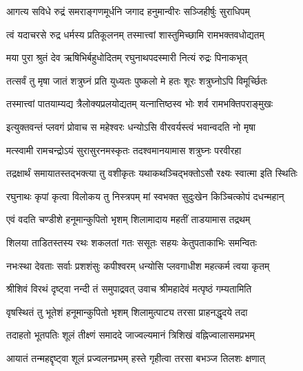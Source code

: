 

\twolineshloka
{आगत्य सविधे रुद्रं समराङ्गणमूर्धनि}
{जगाद हनुमान्वीरः सञ्जिहीर्षुः सुराधिपम्}%


\twolineshloka
{त्वं यदाचरसे रुद्र धर्मस्य प्रतिकूलनम्}
{तस्मात्त्वां शास्तुमिच्छामि रामभक्तवधोद्यतम्}%

\twolineshloka
{मया पुरा श्रुतं देव ऋषिभिर्बहुधोदितम्}
{रघुनाथपदस्मारी नित्यं रुद्रः पिनाकभृत्}%

\twolineshloka
{तत्सर्वं तु मृषा जातं शत्रुघ्नं प्रति युध्यतः}
{पुष्कलो मे हतः शूरः शत्रुघ्नोऽपि विमूर्च्छितः}%

\twolineshloka
{तस्मात्त्वां पातयाम्यद्य त्रैलोक्यप्रलयोद्यतम्}
{यत्नात्तिष्ठस्व भोः शर्व रामभक्तिपराङ्मुखः}%


\twolineshloka
{इत्युक्तवन्तं प्लवगं प्रोवाच स महेश्वरः}
{धन्योऽसि वीरवर्यस्त्वं भवान्वदति नो मृषा}%

\twolineshloka
{मत्स्वामी रामचन्द्रोऽयं सुरासुरनमस्कृतः}
{तदश्वमानयामास शत्रुघ्नः परवीरहा}%

\twolineshloka
{तद्रक्षार्थं समायातस्तद्भक्त्या तु वशीकृतः}
{यथाकथञ्चिद्भक्तोऽसौ रक्ष्यः स्वात्मा इति स्थितिः}%

\twolineshloka
{रघुनाथः कृपां कृत्वा विलोकय तु निस्त्रपम्}
{मां स्वभक्त सुदुःखेन किञ्चित्कोपं दधन्महान्}%


\twolineshloka
{एवं वदति चण्डीशे हनूमान्कुपितो भृशम्}
{शिलामादाय महतीं ताडयामास तद्रथम्}%

\twolineshloka
{शिलया ताडितस्तस्य रथः शकलतां गतः}
{ससूतः सहयः केतुपताकाभिः समन्वितः}%

\twolineshloka
{नभःस्था देवताः सर्वाः प्रशशंसुः कपीश्वरम्}
{धन्योसि प्लवगाधीश महत्कर्म त्वया कृतम्}%

\twolineshloka
{श्रीशिवं विरथं दृष्ट्वा नन्दी तं समुपाद्रवत्}
{उवाच श्रीमहादेवं मत्पृष्ठं गम्यतामिति}%

\twolineshloka
{वृषस्थितं तु भूतेशं हनूमान्कुपितो भृशम्}
{शिलामुत्पाट्य तरसा प्राहनद्धृदये तदा}%

\twolineshloka
{तदाहतो भूतपतिः शूलं तीक्ष्णं समाददे}
{जाज्वल्यमानं त्रिशिखं वह्निज्वालासमप्रभम्}%

\twolineshloka
{आयातं तन्महद्दृष्ट्वा शूलं प्रज्वलनप्रभम्}
{हस्ते गृहीत्वा तरसा बभञ्ज तिलशः क्षणात्}%


